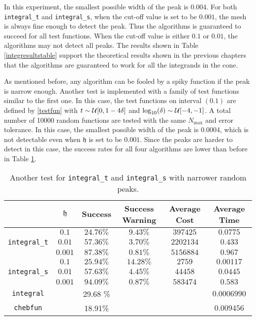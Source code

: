\documentclass{iitthesis}
\theoremstyle{definition}
\theoremstyle{remark}
\begin{document}
In this experiment, the smallest possible width of the peak is $0.004$. For both {\tt integral\_t} and {\tt integral\_s}, when the cut-off value is set to be $0.001$, the mesh is always fine enough to detect the peak. Thus the algorithms is guaranteed to succeed for all test functions. When the cut-off value is either $0.1$ or $0.01$, the algorithms may not detect all peaks. The results shown in Table \ref{integresultstable} support the theoretical results shown in the previous chapters that the algorithms are guaranteed to work for all the integrands in the cone.

As mentioned before, any algorithm can be fooled by a spiky function if the peak is narrow enough. Another test is implemented with a family of test functions similar to the first one. In this case, the test functions on interval $(0.1)$ are defined by \eqref{testfun} with  $t \sim \mathcal{U}[0,1-4\delta]$ and $\log_{10}(\delta) \sim \mathcal{U}[-4,-1]$. A total number of 10000 random functions are tested with the same $N_{\max}$ and error tolerance. In this case, the smallest possible width of the peak is $0.0004$, which is not detectable even when $\mathfrak{h}$ is set to be $0.001$. Since the peaks are harder to detect in this case, the success rates for all four algorithms are lower than before in Table \ref{widerresultstable}.

\begin{table}[ht]
\caption{Another test for {\tt integral\_t} and {\tt integral\_s} with narrower random peaks.}
\centering
\begin{tabular}{cccccc}
\hline\hline
& $\mathfrak{h}$ & Success & Success Warning & Average Cost & Average Time \\
\hline
&$0.1$  & $24.76\%$ &  $9.43\%$  & $397425$ & $0.0775$\\
{\tt integral\_t}
 &$0.01$  & $57.36\%$ & $3.70\%$ & $2202134$ & $0.433$\\
&$0.001$ & $87.38\%$ &$0.81\%$ & $5156884$ & $0.967$\\
\hline
&$0.1$  & $25.94\%$ &  $14.28\%$  & $2759$ & $0.00117$\\
{\tt integral\_s}
 &$0.01$  & $57.63\%$ & $4.45\%$ & $44458$ & $0.0445$\\
&$0.001$ & $94.09\%$ &$0.87\%$ & $583474$ & $0.583$\\
\hline
{\tt integral} &  & 29.68 \% & & &$0.0006990$\\
{\tt chebfun} &  &18.91\% & & &$0.009456$\\
\hline
\end{tabular}
\label{widerresultstable}
\end{table}
\end{document}
